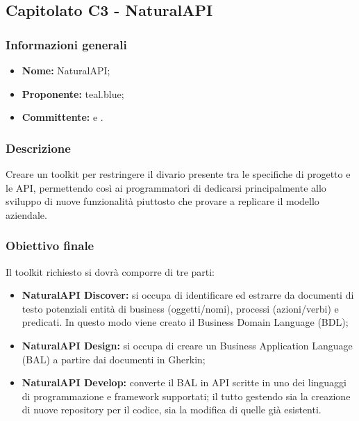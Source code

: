 \subsection{Capitolato C3 - NaturalAPI}

\subsubsection{Informazioni generali}
	\begin{itemize}
		\item \textbf{Nome:} NaturalAPI; 
		\item \textbf{Proponente:} teal.blue;
		\item \textbf{Committente:} \TV{} e \RC{}. 
	\end{itemize}

\subsubsection{Descrizione}
Creare un toolkit per restringere il divario presente tra le specifiche di progetto e le API, permettendo così ai programmatori di dedicarsi principalmente allo sviluppo di nuove funzionalità piuttosto che provare a replicare il modello aziendale. 

\subsubsection{Obiettivo finale}
Il toolkit richiesto si dovrà comporre di tre parti: 
\begin{itemize}
	\item \textbf{NaturalAPI Discover:} si occupa di identificare ed estrarre da documenti di testo potenziali entità di business (oggetti/nomi), processi (azioni/verbi) e predicati. In questo modo viene creato il Business Domain Language (BDL);  
	\item \textbf{NaturalAPI Design:} si occupa di creare un Business Application Language (BAL) a partire dai documenti in Gherkin; 
	\item \textbf{NaturalAPI Develop:} converte il BAL in API scritte in uno dei linguaggi di programmazione e framework supportati; il tutto gestendo sia la creazione di nuove repository per il codice, sia la modifica di quelle già esistenti. 
\end{itemize}

